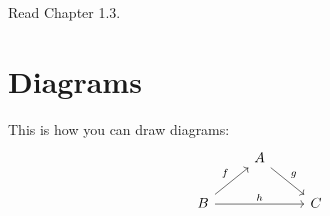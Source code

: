 \def\pathToRoot{../../}




\begin{hint}
  Read Chapter 1.3.
\end{hint}

\section{Diagrams}

\begin{hint}
  This is how you can draw diagrams:
  \[
    \begin{tikzcd}
                                    & A \arrow{dr}{g}    & \\
      B \arrow{ur}{f} \arrow{rr}{h} &                    & C
    \end{tikzcd}
  \]
\end{hint}



